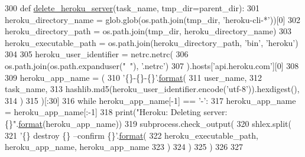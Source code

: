 \begin{DoxyCode}
300 \textcolor{keyword}{def }\hyperlink{namespaceparlai_1_1mturk_1_1core_1_1server__utils_a8dfde882f9d6ff492ca565ae2334fc70}{delete\_heroku\_server}(task\_name, tmp\_dir=parent\_dir):
301     heroku\_directory\_name = glob.glob(os.path.join(tmp\_dir, \textcolor{stringliteral}{'heroku-cli-*'}))[0]
302     heroku\_directory\_path = os.path.join(tmp\_dir, heroku\_directory\_name)
303     heroku\_executable\_path = os.path.join(heroku\_directory\_path, \textcolor{stringliteral}{'bin'}, \textcolor{stringliteral}{'heroku'})
304 
305     heroku\_user\_identifier = netrc.netrc(
306         os.path.join(os.path.expanduser(\textcolor{stringliteral}{"~"}), \textcolor{stringliteral}{'.netrc'})
307     ).hosts[\textcolor{stringliteral}{'api.heroku.com'}][0]
308 
309     heroku\_app\_name = (
310         \textcolor{stringliteral}{'\{\}-\{\}-\{\}'}.\hyperlink{namespaceparlai_1_1chat__service_1_1services_1_1messenger_1_1shared__utils_a32e2e2022b824fbaf80c747160b52a76}{format}(
311             user\_name,
312             task\_name,
313             hashlib.md5(heroku\_user\_identifier.encode(\textcolor{stringliteral}{'utf-8'})).hexdigest(),
314         )
315     )[:30]
316     \textcolor{keywordflow}{while} heroku\_app\_name[-1] == \textcolor{stringliteral}{'-'}:
317         heroku\_app\_name = heroku\_app\_name[:-1]
318     print(\textcolor{stringliteral}{"Heroku: Deleting server: \{\}"}.\hyperlink{namespaceparlai_1_1chat__service_1_1services_1_1messenger_1_1shared__utils_a32e2e2022b824fbaf80c747160b52a76}{format}(heroku\_app\_name))
319     subprocess.check\_output(
320         shlex.split(
321             \textcolor{stringliteral}{'\{\} destroy \{\} --confirm \{\}'}.\hyperlink{namespaceparlai_1_1chat__service_1_1services_1_1messenger_1_1shared__utils_a32e2e2022b824fbaf80c747160b52a76}{format}(
322                 heroku\_executable\_path, heroku\_app\_name, heroku\_app\_name
323             )
324         )
325     )
326 
327 
\end{DoxyCode}
\mbox{\label{namespaceparlai_1_1mturk_1_1core_1_1dev_1_1server__utils_aa5556bd5a5a417d78b4142e697e9a6be}} 
